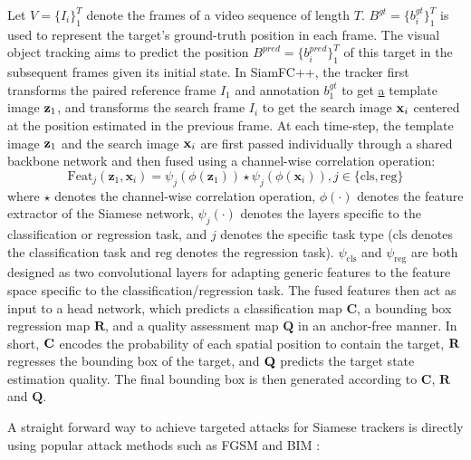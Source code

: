 \documentclass[journal]{IEEEtran}
\begin{document}
Let $V=\{I_i\}_1^T$ denote the frames of a video sequence of length $T$. $B^{gt}=\{b^{gt}_i\}_1^T$ is used to represent the target's ground-truth position in each frame. The visual object tracking aims to predict the position $B^{pred}=\{b^{pred}_i\}_1^T$ of this target in the subsequent frames given its initial state. In SiamFC++, the tracker first transforms the paired reference frame $I_1$ and annotation $b_1^{gt}$ to get \uline{a} template image $\textbf z_1$, and transforms the search frame $I_i$ to get the search image $\textbf x_i$ centered at the position estimated in the previous frame. At each time-step, the template image $\textbf z_1$ and the search image $\textbf x_i$ are first passed individually through a shared backbone network and then fused using a channel-wise correlation operation:
\begin{equation}
  \text{Feat}_{j}(\mathbf{z}_1, \mathbf{x}_i)=\psi_{j}(\phi(\mathbf{z}_1)) \star \psi_{j}(\phi(\mathbf{x}_i)), j \in\{\mathrm{cls}, \mathrm{reg}\}
\end{equation}
where $\star$ denotes the channel-wise correlation operation, $\phi(\cdot)$ denotes the feature extractor of the Siamese network, $\psi_j(\cdot)$ denotes the layers specific to the classification or regression task, and $j$ denotes the specific task type ($\mathrm{cls}$ denotes the classification task and $\mathrm{reg}$ denotes the regression task). $\psi_{\mathrm{cls}}$ and $\psi_{\mathrm{reg}}$ are both designed as two convolutional layers for adapting generic features to the feature space specific to the classification/regression task. The fused features then act as input to a head network, which predicts a classification map $\textbf{C}$, a bounding box regression map $\textbf{R}$, and a quality assessment map $\textbf{Q}$ in an anchor-free manner. In short, $\textbf C$ encodes the probability of each spatial position to contain the target, $\textbf R$ regresses the bounding box of the target, and $\textbf Q$ predicts the target state estimation quality. The final bounding box is then generated according to $\textbf{C}$, $\textbf{R}$ and $\textbf{Q}$.

A straight forward way to achieve targeted attacks for Siamese trackers is directly using popular attack methods such as FGSM \cite{FGSM} and BIM \cite{DBLP:conf/iclr/KurakinGB17a}:
\end{document}
